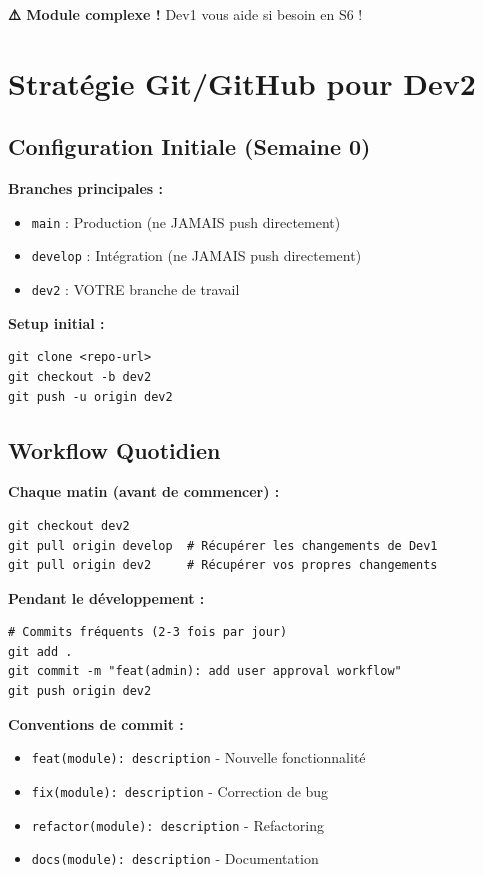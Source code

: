 \documentclass[11pt,a4paper]{article}
\begin{document}
\textbf{⚠️ Module complexe !} Dev1 vous aide si besoin en S6 !

\newpage

\section{Stratégie Git/GitHub pour Dev2}

\subsection{Configuration Initiale (Semaine 0)}

\textbf{Branches principales :}
\begin{itemize}
    \item \texttt{main} : Production (ne JAMAIS push directement)
    \item \texttt{develop} : Intégration (ne JAMAIS push directement)
    \item \texttt{dev2} : VOTRE branche de travail
\end{itemize}

\textbf{Setup initial :}
\begin{verbatim}
git clone <repo-url>
git checkout -b dev2
git push -u origin dev2
\end{verbatim}

\subsection{Workflow Quotidien}

\textbf{Chaque matin (avant de commencer) :}
\begin{verbatim}
git checkout dev2
git pull origin develop  # Récupérer les changements de Dev1
git pull origin dev2     # Récupérer vos propres changements
\end{verbatim}

\textbf{Pendant le développement :}
\begin{verbatim}
# Commits fréquents (2-3 fois par jour)
git add .
git commit -m "feat(admin): add user approval workflow"
git push origin dev2
\end{verbatim}

\textbf{Conventions de commit :}
\begin{itemize}
    \item \texttt{feat(module): description} - Nouvelle fonctionnalité
    \item \texttt{fix(module): description} - Correction de bug
    \item \texttt{refactor(module): description} - Refactoring
    \item \texttt{docs(module): description} - Documentation
\end{itemize}
\end{document}
